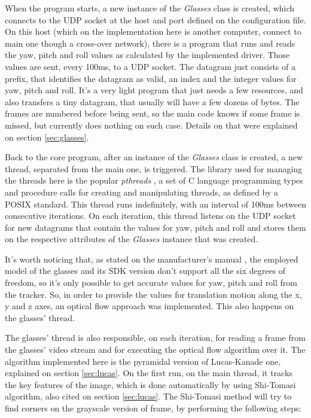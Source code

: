 \documentclass[msc, a4paper, classic, en]{ufbathesis}
\begin{document}
When the program starts, a new instance of the \textit{Glasses} class is created, which connects to the UDP socket at the host and port defined on the configuration file. On this host (which on the implementation here is another computer, connect to main one though a cross-over network), there is a program that runs and reads the yaw, pitch and roll values as calculated by the implemented driver. Those values are sent, every 100ms, to a UDP socket. The datagram just consists of a prefix, that identifies the datagram as valid, an index and the integer values for yaw, pitch and roll. It's a very light program that just needs a few resources, and also transfers a tiny datagram, that usually will have a few dozens of bytes. The frames are numbered before being sent, so the main code knows if some frame is missed, but currently does nothing on such case. Details on that were explained on section \ref{sec:glasses}.

Back to the core program, after an instance of the \textit{Glasses} class is created, a new thread, separated from the main one, is triggered. The library used for managing the threads here is the popular \textit{pthreads} \cite{pthreads}, a set of C language programming types and procedure calls for creating and manipulating threads, as defined by a POSIX standard. This thread runs indefinitely, with an interval of 100ms between consecutive iterations. On each iteration, this thread listens on the UDP socket for new datagrams that contain the values for yaw, pitch and roll and stores them on the respective attributes of the \textit{Glasses} instance that was created.

It's worth noticing that, as stated on the manufacturer's manual \cite{vuzixsdk}, the employed model of the glasses and its SDK version don't support all the six degrees of freedom, so it's only possible to get accurate values for yaw, pitch and roll from the tracker. So, in order to provide the values for translation motion along the x, y and z axes, an optical flow approach was implemented. This also happens on the glasses' thread.

The glasses' thread is also responsible, on each iteration, for reading a frame from the glasses' video stream and for executing the optical flow algorithm over it. The algorithm implemented here is the pyramidal version of Lucas-Kanade one, explained on section \ref{sec:lucas}. On the first run, on the main thread, it tracks the key features of the image, which is done automatically by using Shi-Tomasi algorithm, also cited on section \ref{sec:lucas}. The Shi-Tomasi method will try to find corners on the grayscale version of frame, by performing the following steps:
\end{document}
